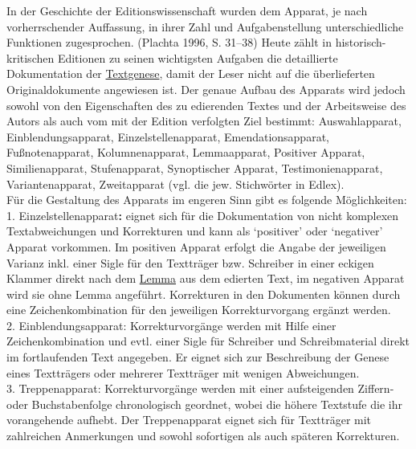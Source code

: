 \documentclass{article}
\begin{document}
        In der Geschichte der Editionswissenschaft wurden dem Apparat, je nach vorherrschender Auffassung, in ihrer Zahl und Aufgabenstellung unterschiedliche Funktionen zugesprochen. (Plachta 1996, S. 31–38) Heute zählt in historisch-kritischen Editionen zu seinen wichtigsten Aufgaben die detaillierte Dokumentation der \href{http://gams.uni-graz.at/o:konde.28}{Textgenese}, damit der Leser nicht auf die überlieferten Originaldokumente angewiesen ist. Der genaue Aufbau des Apparats wird jedoch sowohl von den Eigenschaften des zu edierenden Textes und der Arbeitsweise des Autors als auch vom mit der Edition verfolgten Ziel bestimmt: Auswahlapparat, Einblendungsapparat, Einzelstellenapparat, Emendationsapparat, Fußnotenapparat, Kolumnenapparat, Lemmaapparat, Positiver Apparat, Similienapparat, Stufenapparat, Synoptischer Apparat, Testimonienapparat, Variantenapparat, Zweitapparat (vgl. die jew. Stichwörter in Edlex).  \\
            
        Für die Gestaltung des Apparats im engeren Sinn gibt es folgende Möglichkeiten:\\
            
        1.	Einzelstellenapparat\textbf{:}  eignet sich für die Dokumentation von nicht komplexen Textabweichungen und Korrekturen und kann als ‘positiver’ oder ‘negativer’ Apparat vorkommen. Im positiven Apparat erfolgt die Angabe der jeweiligen Varianz inkl. einer Sigle für den Textträger bzw. Schreiber in einer eckigen Klammer direkt nach dem \href{http://gams.uni-graz.at/o:konde.115}{Lemma} aus dem edierten Text, im negativen Apparat wird sie ohne Lemma angeführt. Korrekturen in den Dokumenten können durch eine Zeichenkombination für den jeweiligen Korrekturvorgang ergänzt werden.\\
            
        2.	Einblendungsapparat: Korrekturvorgänge werden mit Hilfe einer Zeichenkombination und evtl. einer Sigle für Schreiber und Schreibmaterial direkt im fortlaufenden Text angegeben. Er eignet sich zur Beschreibung der Genese eines Textträgers oder mehrerer Textträger mit wenigen Abweichungen.\\
            
        3.	Treppenapparat: Korrekturvorgänge werden mit einer aufsteigenden Ziffern- oder Buchstabenfolge chronologisch geordnet, wobei die höhere Textstufe die ihr vorangehende aufhebt. Der Treppenapparat eignet sich für Textträger mit zahlreichen Anmerkungen und sowohl sofortigen als auch späteren Korrekturen.\\
            
\end{document}

